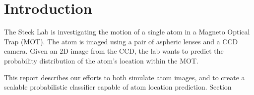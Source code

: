 \section{Introduction}

The Steck Lab is investigating the motion of a single atom in a Magneto Optical Trap (MOT).  The atom is imaged using a pair of aspheric lenses and a CCD camera.  Given an 2D image from the CCD, the lab wants to predict the probability distribution of the atom's location within the MOT.

This report describes our efforts to both simulate atom images, and to create a scalable probabilistic classifier capable of atom location prediction.  Section 